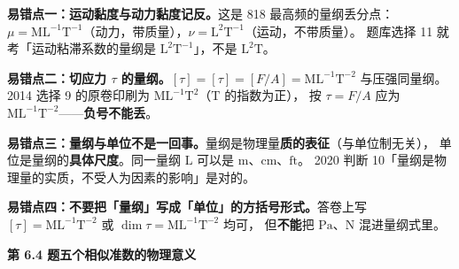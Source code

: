 \begin{yicuo}
\textbf{易错点一：运动黏度与动力黏度记反。}这是 818 最高频的量纲丢分点：
$\mu=\mathrm{ML^{-1}T^{-1}}$（动力，带质量），$\nu=\mathrm{L^{2}T^{-1}}$（运动，不带质量）。
题库选择 11 就考「运动粘滞系数的量纲是 $\mathrm{L^{2}T^{-1}}$」，不是 $\mathrm{L^{2}T}$。

\textbf{易错点二：切应力 $\tau$ 的量纲。}$[\tau]=[\tau]=[F/A]=\mathrm{ML^{-1}T^{-2}}$ 与压强同量纲。
2014 选择 9 的原卷印刷为 $\mathrm{ML^{-1}T^{2}}$（$\mathrm{T}$ 的指数为正），
按 $\tau=F/A$ 应为 $\mathrm{ML^{-1}T^{-2}}$——\textbf{负号不能丢}。

\textbf{易错点三：量纲与单位不是一回事。}量纲是物理量\textbf{质的表征}（与单位制无关），
单位是量纲的\textbf{具体尺度}。同一量纲 $\mathrm{L}$ 可以是 $\mathrm{m}$、$\mathrm{cm}$、$\mathrm{ft}$。
2020 判断 10「量纲是物理量的实质，不受人为因素的影响」是对的。

\textbf{易错点四：不要把「量纲」写成「单位」的方括号形式。}答卷上写
$[\tau]=\mathrm{ML^{-1}T^{-2}}$ 或 $\dim\tau=\mathrm{ML^{-1}T^{-2}}$ 均可，
但\textbf{不能}把 $\mathrm{Pa}$、$\mathrm{N}$ 混进量纲式里。
\end{yicuo}

\noindent\textbf{第 6.4 题\quad 五个相似准数的物理意义}

